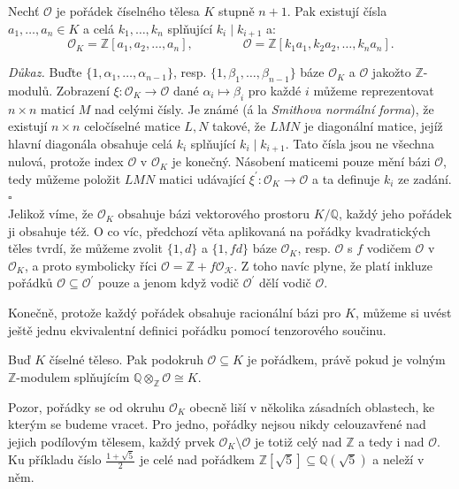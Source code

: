 \documentclass[12pt]{report}
\begin{document}
\begin{veta}
Nechť $\mathcal{O}$ je pořádek číselného tělesa $K$ stupně $n+1$. Pak existují čísla $a_1,\dots,a_n \in K$ a celá $k_1,\dots,k_n$ splňující $k_i \mid k_{i+1}$ a:
\begin{equation*}
\mathcal{O}_K = \mathbb{Z}[a_1,a_2,\dots,a_n], \qquad \qquad \mathcal{O} = \mathbb{Z}[k_1 a_1, k_2 a_2, \dots, k_n a_n].
\end{equation*}
\end{veta}
\noindent \textit{Důkaz.} Buďte $\lbrace 1,\alpha_1,\dots,\alpha_{n-1} \rbrace$, resp. $\lbrace 1,\beta_1,\dots,\beta_{n-1} \rbrace$ báze $\mathcal{O}_K$ a $\mathcal{O}$ jakožto $\mathbb{Z}$-modulů. Zobrazení $\xi:\mathcal{O}_K \longrightarrow \mathcal{O}$ dané $\alpha_i \longmapsto \beta_i$ pro každé $i$ můžeme reprezentovat $n \times n$ maticí $M$ nad celými čísly. Je známé (á la \textit{Smithova normální forma}), že existují $n \times n$ celočíselné matice $L,N$ takové, že $LMN$ je diagonální matice, jejíž hlavní diagonála obsahuje celá $k_i$ splňující $k_i \mid k_{i+1}$. Tato čísla jsou ne všechna nulová, protože index $\mathcal{O}$ v $\mathcal{O}_K$ je konečný. Násobení maticemi pouze mění bázi $\mathcal{O}$, tedy můžeme položit $LMN$ matici udávající $\xi^\prime : \mathcal{O}_K \longrightarrow \mathcal{O}$ a ta definuje $k_i$ ze zadání. \hfill $\square$\\

Jelikož víme, že $\mathcal{O}_K$ obsahuje bázi vektorového prostoru $K/\mathbb{Q}$, každý jeho pořádek ji obsahuje též. O co víc, předchozí věta aplikovaná na pořádky kvadratických těles tvrdí, že můžeme zvolit $\lbrace 1,d \rbrace$ a $\lbrace 1,fd \rbrace$ báze $\mathcal{O}_K$, resp. $\mathcal{O}$ s $f$ vodičem $\mathcal{O}$ v $\mathcal{O}_K$, a proto symbolicky říci $\mathcal{O} = \mathbb{Z}+ f\mathcal{O_K}$. Z toho navíc plyne, že platí inkluze pořádků $\mathcal{O} \subseteq \mathcal{O}^\prime$ pouze a jenom když vodič $\mathcal{O}^\prime$ dělí vodič $\mathcal{O}$.

Konečně, protože každý pořádek obsahuje racionální bázi pro $K$, můžeme si uvést ještě  jednu ekvivalentní definici pořádku pomocí tenzorového součinu.
\begin{dusledek}\label{poradektensor}
Buď $K$ číselné těleso. Pak podokruh $\mathcal{O} \subseteq K$ je pořádkem, právě pokud je volným $\mathbb{Z}$-modulem splňujícím $\mathbb{Q} \otimes_{\mathbb{Z}} \mathcal{O} \cong K$.
\end{dusledek}

Pozor, pořádky se od okruhu $\mathcal{O}_K$ obecně liší v několika zásadních oblastech, ke kterým se budeme vracet. Pro jedno, pořádky nejsou nikdy celouzavřené nad jejich podílovým tělesem, každý prvek $\mathcal{O}_K \setminus \mathcal{O}$ je totiž celý nad $\mathbb{Z}$ a tedy i nad $\mathcal{O}$. Ku příkladu číslo $\frac{1+\sqrt{5}}{2}$ je celé nad pořádkem $\mathbb{Z}[\sqrt{5}] \subseteq \mathbb{Q}(\sqrt{5})$ a neleží v něm.
\end{document}
